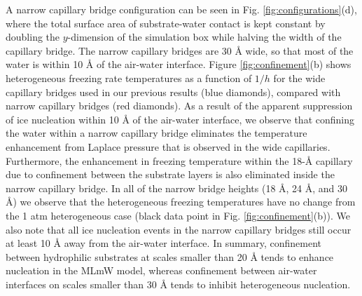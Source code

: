 \documentclass[journal abbreviation, manuscript]{copernicus}
\begin{document}
A narrow capillary bridge configuration can be seen in Fig. \ref{fig:configurations}(d), where the total surface area of substrate-water contact is kept constant by doubling the $y$-dimension of the simulation box while halving the width of the capillary bridge. The narrow capillary bridges are 30 \AA{} wide, so that most of the water is within 10 \AA{} of the air-water interface. Figure \ref{fig:confinement}(b) shows heterogeneous freezing rate temperatures as a function of $1/h$ for the wide capillary bridges used in our previous results (blue diamonds), compared with narrow capillary bridges (red diamonds). As a result of the apparent suppression of ice nucleation within 10 \AA{} of the air-water interface, we observe that confining the water within a narrow capillary bridge eliminates the temperature enhancement from Laplace pressure that is observed in the wide capillaries. Furthermore, the enhancement in freezing temperature within the 18-\AA{} capillary due to confinement between the substrate layers is also eliminated inside the narrow capillary bridge. In all of the narrow bridge heights (18 \AA{}, 24 \AA{}, and 30 \AA{}) we observe that the heterogeneous freezing temperatures have no change from the 1 atm heterogeneous case (black data point in Fig. \ref{fig:confinement}(b)). We also note that all ice nucleation events in the narrow capillary bridges still occur at least 10 \AA{} away from the air-water interface. In summary, confinement between hydrophilic substrates at scales smaller than 20 \AA{} tends to enhance nucleation in the MLmW model, whereas confinement between air-water interfaces on scales smaller than 30 \AA{} tends to inhibit heterogeneous nucleation.
\end{document}
